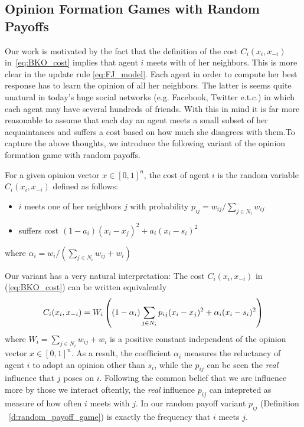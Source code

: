\subsection{Opinion Formation Games with Random Payoffs}
Our work is motivated by the fact that the definition of the cost $C_i(x_i,x_{-i})$
in~\ref{eq:BKO_cost} implies that agent $i$ meets with of her neighbors. This is more
clear in the update rule \ref{eq:FJ_model}. Each agent in order to compute her best response
has to learn the opinion of all her neighbors. The latter is seems quite unatural in today's
huge social networks (e.g. Facebook, Twitter e.t.c.) in which each agent may have
several hundreds of friends. With this in mind it is far more reasonable to assume
that each day an agent meets a small subset of her acquaintances and
suffers a cost based on how much she disagrees with them.To capture the above thoughts,
we introduce the following variant of the opinion formation game with random
payoffs.

\begin{definition}\label{d:random_payoff_game}
  For a given opinion vector $x \in [0,1]^n$, the cost of agent $i$
  is the random variable $C_i(x_i,x_{-i})$ defined as follows:
  \begin{itemize}
    \item $i$ meets one of her neighbors $j$ with probability $p_{ij}= w_{ij}/\sum_{j\in N_i}w_{ij}$
    \item suffers cost $(1-a_i)(x_i-x_j)^2 + a_i(x_i-s_i)^2$
  \end{itemize}
  where $\alpha_i = w_i/(\sum_{j\in N_i}w_{ij}+w_i)$
\end{definition}
\noindent Our variant has a very natural interpretation: The cost $C_i(x_i,x_{-i})$ in (\ref{eq:BKO_cost})
can be written equivalently
\begin{equation}\label{eq:BKO11_cost_equivalent}
C_i(x_i,x_{-i}) = W_i\left( (1-\alpha_i)\sum_{j \in N_i} p_{ij}(x_i-x_j)^2  + \alpha_i(x_i-s_i)^2\right)
\end{equation}
where $W_i=\sum_{j\in N_i}w_{ij} + w_i$ is a positive constant independent of the opinion vector $x\in [0,1]^n$. As a result, the coefficient $\alpha_i$
measures the reluctancy of agent $i$ to adopt an opinion other than $s_i$, while the $p_{ij}$ can be seen the \emph{real} influence that $j$ poses on $i$.
Following the common belief that we are influence more by those we interact oftently, the \emph{real} influence $p_{ij}$ can intepreted as measure of how
often $i$ meets with $j$. In our random payoff variant $p_{ij}$ (Definition ~\ref{d:random_payoff_game}) is exactly the frequency that $i$ meets $j$. 

